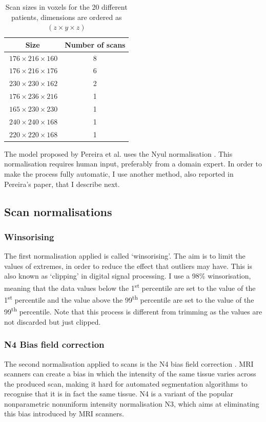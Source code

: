 \documentclass[12pt,a4paper,twoside,openright]{report}
\begin{document}
\begin{table}[h]
\centering	
\begin{tabular}{ c c } 
\textbf{Size} & \textbf{Number of scans}\\
 \hline
 $\ 176 \times 216 \times 160$ & 8 \\ 
 $\ 176 \times 216 \times 176$ & 6 \\ 
 $\ 230 \times 230 \times 162$ & 2 \\ 
 $\ 176 \times 236 \times 216$ & 1 \\ 
 $\ 165 \times 230 \times 230$ & 1 \\ 
 $\ 240 \times 240 \times 168$ & 1 \\ 
 $\ 220 \times 220 \times 168$ & 1 \\ 
\end{tabular}
\caption{Scan sizes in voxels for the 20 different patients, dimensions are ordered as $(z \times y \times z)$}
\label{table:scan_sizes}
\end{table}

The model proposed by Pereira et al. \cite{pereira} uses the Nyul normalisation \cite{nyul}. This normalisation requires human input, preferably from a domain expert. In order to make the process fully automatic, I use another method, also reported in Pereira's paper, that I describe next.

\subsection{Scan normalisations}
\label{section:scan_normalisations}
\subsubsection{Winsorising}
The first normalisation applied is called `winsorising'. The aim is to limit the values of extremes, in order to reduce the effect that outliers may have. This is also known as `clipping' in digital signal processing. I use a 98\% winsorisation, meaning that the data values below the 1\textsuperscript{st} percentile are set to the value of the 1\textsuperscript{st} percentile and the value above the 99\textsuperscript{th} percentile are set to the value of the 99\textsuperscript{th} percentile. Note that this process is different from trimming as the values are not discarded but just clipped.

\subsubsection{N4 Bias field correction}
The second normalisation applied to scans is the N4 bias field correction \cite{n4itk}. MRI scanners can create a bias in which the intensity of the same tissue varies across the produced scan, making it hard for automated segmentation algorithms to recognise that it is in fact the same tissue. N4 is a variant of the popular nonparametric nonuniform intensity normalisation N3, which aims at eliminating this bias introduced by MRI scanners. 
\end{document}
